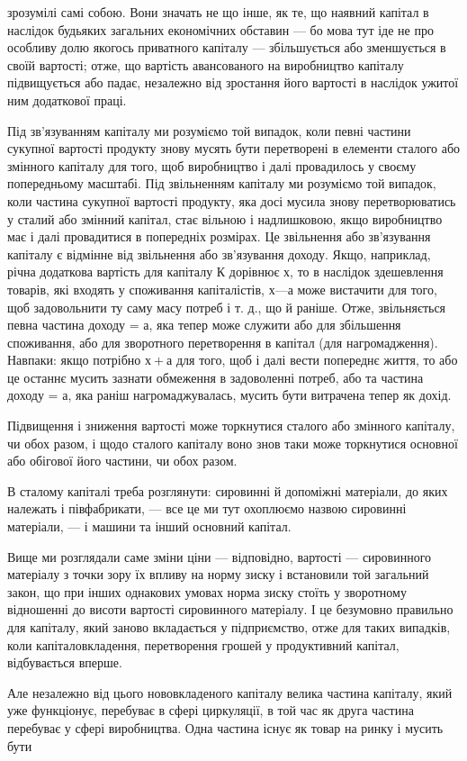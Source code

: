\parcont{}  %
зрозумілі самі собою. Вони значать не що інше, як те, що наявний
капітал в наслідок будьяких загальних економічних обставин
— бо мова тут іде не про особливу долю якогось приватного
капіталу — збільшується або зменшується в своїй вартості;
отже, що вартість авансованого на виробництво капіталу
підвищується або падає, незалежно від зростання його вартості
в наслідок ужитої ним додаткової праці.

Під зв’язуванням капіталу ми розуміємо той випадок, коли
певні частини сукупної вартості продукту знову мусять бути
перетворені в елементи сталого або змінного капіталу для
того, щоб виробництво і далі провадилось у своєму попередньому
масштабі. Під звільненням капіталу ми розуміємо той
випадок, коли частина сукупної вартості продукту, яка досі
мусила знову перетворюватись у сталий або змінний капітал,
стає вільною і надлишковою, якщо виробництво має і далі провадитися
в попередніх розмірах. Це звільнення або зв’язування
капіталу є відмінне від звільнення або зв’язування доходу. Якщо,
наприклад, річна додаткова вартість для капіталу $К$ дорівнює
$х$, то в наслідок здешевлення товарів, які входять у споживання
капіталістів, $х — а$ може вистачити для того, щоб задовольнити
ту саму масу потреб і т. д., що й раніше. Отже,
звільняється певна частина доходу = $а$, яка тепер може служити
або для збільшення споживання, або для зворотного перетворення
в капітал (для нагромадження). Навпаки: якщо потрібно
$х + а$ для того, щоб і далі вести попереднє життя, то або це
останнє мусить зазнати обмеження в задоволенні потреб, або
та частина доходу = $а$, яка раніш нагромаджувалась, мусить бути
витрачена тепер як дохід.

Підвищення і зниження вартості може торкнутися сталого
або змінного капіталу, чи обох разом, і щодо сталого капіталу
воно знов таки може торкнутися основної або обігової його
частини, чи обох разом.

В сталому капіталі треба розглянути: сировинні й допоміжні
матеріали, до яких належать і півфабрикати, — все це ми тут
охоплюємо назвою сировинні матеріали, — і машини та інший
основний капітал.

Вище ми розглядали саме зміни ціни — відповідно, вартості —
сировинного матеріалу з точки зору їх впливу на норму зиску
і встановили той загальний закон, що при інших однакових умовах
норма зиску стоїть у зворотному відношенні до висоти вартості
сировинного матеріалу. І це безумовно правильно для
капіталу, який заново вкладається у підприємство, отже для
таких випадків, коли капіталовкладення, перетворення грошей
у продуктивний капітал, відбувається вперше.

Але незалежно від цього нововкладеного капіталу велика
частина капіталу, який уже функціонує, перебуває в сфері
циркуляції, в той час як друга частина перебуває у сфері виробництва.
Одна частина існує як товар на ринку і мусить бути
\parbreak{}  %

